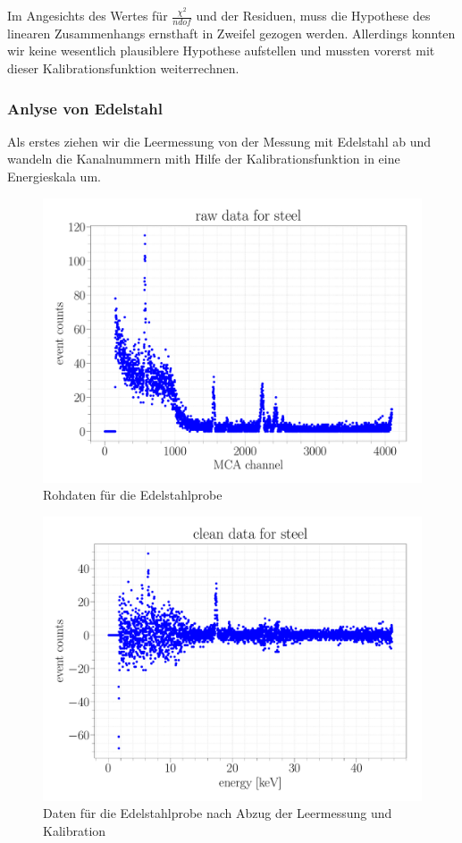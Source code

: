\documentclass[a4paper,14pt]{article}
\begin{document}
Im Angesichts des Wertes für $\frac{\chi^2}{ndof}$ und der Residuen, muss die Hypothese des linearen Zusammenhangs ernsthaft in Zweifel gezogen werden. Allerdings konnten wir keine wesentlich plausiblere Hypothese aufstellen und mussten vorerst mit dieser Kalibrationsfunktion weiterrechnen.

\subsubsection{Anlyse von Edelstahl}
Als erstes ziehen wir die Leermessung von der Messung mit Edelstahl ab und wandeln die Kanalnummern mith Hilfe der Kalibrationsfunktion in eine Energieskala um.

\begin{figure}[H]
\centering
\includegraphics[scale=0.25]{../Figures/am_fe_raw.pdf}
\caption{Rohdaten für die Edelstahlprobe}
\label{am_fe_raw}
\end{figure}

\begin{figure}[H]
\centering
\includegraphics[scale=0.25]{../Figures/am_fe_clean.pdf}
\caption{Daten für die Edelstahlprobe nach Abzug der Leermessung und Kalibration}
\label{resolution}
\end{figure}
\end{document}
